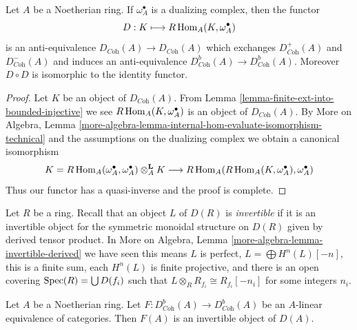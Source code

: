 \begin{lemma}
\label{lemma-dualizing}
Let $A$ be a Noetherian ring. If $\omega_A^\bullet$ is a dualizing
complex, then the functor
$$
D : K \longmapsto R\mathop{\mathrm{Hom}}\nolimits_A(K, \omega_A^\bullet)
$$
is an anti-equivalence $D_{\textit{Coh}}(A) \to D_{\textit{Coh}}(A)$
which exchanges $D^+_{\textit{Coh}}(A)$ and $D^-_{\textit{Coh}}(A)$
and induces an anti-equivalence
$D^b_{\textit{Coh}}(A) \to D^b_{\textit{Coh}}(A)$.
Moreover $D \circ D$ is isomorphic to the identity functor.
\end{lemma}

\begin{proof}
Let $K$ be an object of $D_{\textit{Coh}}(A)$. From
Lemma \ref{lemma-finite-ext-into-bounded-injective}
we see $R\mathop{\mathrm{Hom}}\nolimits_A(K, \omega_A^\bullet)$ is an object of $D_{\textit{Coh}}(A)$.
By More on Algebra, Lemma
\ref{more-algebra-lemma-internal-hom-evaluate-isomorphism-technical}
and the assumptions on the dualizing complex
we obtain a canonical isomorphism
$$
K = R\mathop{\mathrm{Hom}}\nolimits_A(\omega_A^\bullet, \omega_A^\bullet) \otimes_A^\mathbf{L} K
\longrightarrow
R\mathop{\mathrm{Hom}}\nolimits_A(R\mathop{\mathrm{Hom}}\nolimits_A(K, \omega_A^\bullet), \omega_A^\bullet)
$$
Thus our functor has a quasi-inverse and the proof is complete.
\end{proof}

\noindent
Let $R$ be a ring. Recall that an object $L$ of $D(R)$ is
{\it invertible} if it is an invertible object for the
symmetric monoidal structure on $D(R)$ given by derived
tensor product. In
More on Algebra, Lemma \ref{more-algebra-lemma-invertible-derived}
we have seen this means $L$ is perfect, $L = \bigoplus H^n(L)[-n]$,
this is a finite sum, each $H^n(L)$ is finite projective,
and there is an open covering $\mathop{\mathrm{Spec}}(R) = \bigcup D(f_i)$ such that
$L \otimes_R R_{f_i} \cong R_{f_i}[-n_i]$ for some integers $n_i$.

\begin{lemma}
\label{lemma-equivalence-comes-from-invertible}
Let $A$ be a Noetherian ring. Let
$F : D^b_{\textit{Coh}}(A) \to D^b_{\textit{Coh}}(A)$ be an $A$-linear
equivalence of categories. Then $F(A)$ is an invertible object of $D(A)$.
\end{lemma}

